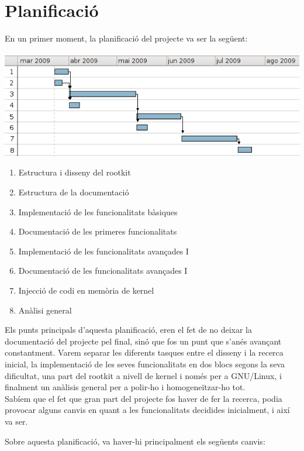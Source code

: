 \chapter{Planificació}

En un primer moment, la planificació del projecte va ser la següent: \\
\\
\includegraphics[scale=0.75,keepaspectratio]{primer_gantt2.png} 

\begin{enumerate}
    \item Estructura i disseny del rootkit
    \item Estructura de la documentació
    \item Implementació de les funcionalitats bàsiques
    \item Documentació de les primeres funcionalitats
    \item Implementació de les funcionalitats avançades I
    \item Documentació de les funcionalitats avançades I
    \item Injecció de codi en memòria de kernel
    \item Anàlisi general
\end{enumerate}

Els punts principals d'aquesta planificació, eren el fet de no deixar la documentació del projecte pel final, 
sinó que fos un punt que s'anés avançant constantment. Varem separar les diferents tasques entre el disseny
i la recerca inicial, la implementació de les seves funcionalitats en dos blocs segons la seva dificultat,
una part del rootkit a nivell de kernel i només per a GNU/Linux, i finalment un anàlisis general per a polir-ho
i homogeneïtzar-ho tot. \\

Sabíem que el fet que gran part del projecte fos haver de fer la recerca, podia provocar alguns canvis en quant a
les funcionalitats decidides inicialment, i així va ser.

Sobre aquesta planificació, va haver-hi principalment els següents canvis:

